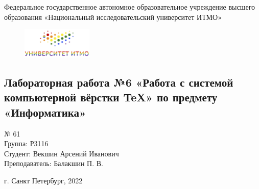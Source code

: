 \begin{center}
\large
Федеральное государственное автономное образовательное учреждение высшего образования
«Национальный исследовательский университет ИТМО»
\end{center}
\begin{figure}[h]
\centering
\includegraphics[width=0.3\textwidth]{itmo_logo.png}
\end{figure}
\vspace{1cm}
\begin{center}
\section*{Лабораторная работа №6 «Работа с системой компьютерной вёрстки \TeX» по предмету \\«Информатика»}
\end{center}
\vspace{9cm}
\begin{flushleft}
 № 61\\Группа: Р3116\\Студент: Векшин Арсений Иванович\\Преподаватель: Балакшин П. В.\\
\end{flushleft}
\vspace{3cm}
\begin{center}
\vspace{2cm}
г. Санкт Петербург, 2022
\end{center}
\thispagestyle{empty}